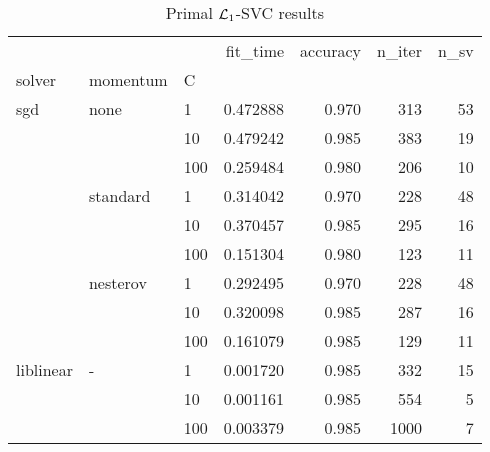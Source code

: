 \begin{table}[H]
\centering
\caption{Primal $\protect \mathcal{L}_1$-SVC results}
\label{primal_l1_svc_cv_results}
\begin{tabular}{lllrrrr}
\toprule
          &   &     &  fit\_time &  accuracy &  n\_iter &  n\_sv \\
solver & momentum & C &           &           &         &       \\
\midrule
sgd & none & 1   &  0.472888 &     0.970 &     313 &    53 \\
          &   & 10  &  0.479242 &     0.985 &     383 &    19 \\
          &   & 100 &  0.259484 &     0.980 &     206 &    10 \\
          & standard & 1   &  0.314042 &     0.970 &     228 &    48 \\
          &   & 10  &  0.370457 &     0.985 &     295 &    16 \\
          &   & 100 &  0.151304 &     0.980 &     123 &    11 \\
          & nesterov & 1   &  0.292495 &     0.970 &     228 &    48 \\
          &   & 10  &  0.320098 &     0.985 &     287 &    16 \\
          &   & 100 &  0.161079 &     0.985 &     129 &    11 \\
liblinear & - & 1   &  0.001720 &     0.985 &     332 &    15 \\
          &   & 10  &  0.001161 &     0.985 &     554 &     5 \\
          &   & 100 &  0.003379 &     0.985 &    1000 &     7 \\
\bottomrule
\end{tabular}
\end{table}
